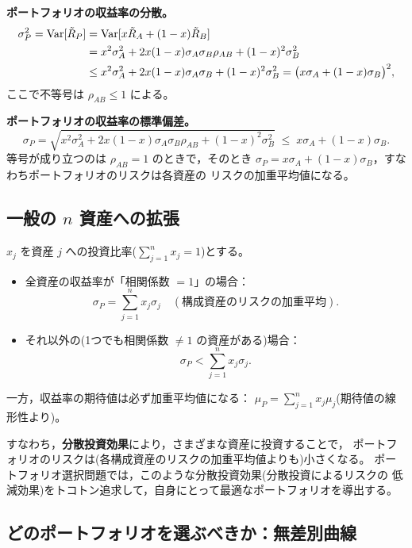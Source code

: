 \textbf{ポートフォリオの収益率の分散。}
\begin{align}
\sigma_P^2 = \mathrm{Var}[\tilde R_P]
&= \mathrm{Var}[x\tilde R_A + (1-x)\tilde R_B]\notag\\
&= x^2\sigma_A^2 + 2x(1-x)\sigma_A\sigma_B\rho_{AB} + (1-x)^2\sigma_B^2\notag\\
&\leq x^2\sigma_A^2 + 2x(1-x)\sigma_A\sigma_B + (1-x)^2\sigma_B^2
= \bigl(x\sigma_A + (1-x)\sigma_B\bigr)^2,
\end{align}
ここで不等号は $\rho_{AB}\leq 1$ による。

\textbf{ポートフォリオの収益率の標準偏差。}
\begin{equation}
\sigma_P = \sqrt{x^2\sigma_A^2 + 2x(1-x)\sigma_A\sigma_B\rho_{AB}
+ (1-x)^2\sigma_B^2}
\;\leq\; x\sigma_A + (1-x)\sigma_B.
\end{equation}
等号が成り立つのは $\rho_{AB}=1$ のときで，そのとき
$\sigma_P = x\sigma_A + (1-x)\sigma_B$，すなわちポートフォリオのリスクは各資産の
リスクの加重平均値になる。

\subsection{一般の $n$ 資産への拡張}

\begin{keypoint}[相関係数とポートフォリオのリスク]
$x_j$ を資産 $j$ への投資比率($\sum_{j=1}^n x_j = 1$)とする。
\begin{itemize}
\item 全資産の収益率が「相関係数 $=1$」の場合：
\[
\sigma_P = \sum_{j=1}^{n} x_j\sigma_j \quad(\text{構成資産のリスクの加重平均}).
\]
\item それ以外の(1つでも相関係数 $\neq 1$ の資産がある)場合：
\[
\sigma_P < \sum_{j=1}^{n} x_j\sigma_j.
\]
\end{itemize}
一方，収益率の期待値は必ず加重平均値になる：
$\mu_P = \sum_{j=1}^{n} x_j\mu_j$(期待値の線形性より)。
\end{keypoint}

すなわち，\textbf{分散投資効果}により，さまざまな資産に投資することで，
ポートフォリオのリスクは(各構成資産のリスクの加重平均値よりも)小さくなる。
ポートフォリオ選択問題では，このような分散投資効果(分散投資によるリスクの
低減効果)をトコトン追求して，自身にとって最適なポートフォリオを導出する。

\subsection{どのポートフォリオを選ぶべきか：無差別曲線}


